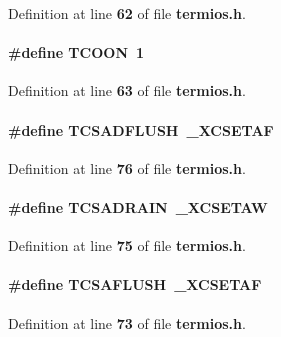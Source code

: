 Definition at line {\bf 62} of file {\bf termios.\+h}.

\paragraph[{T\+C\+O\+ON}]{\setlength{\rightskip}{0pt plus 5cm}\#define T\+C\+O\+ON~1}\label{termios_8h_a8f04f6a470c30f41df591f14c21afb60}


Definition at line {\bf 63} of file {\bf termios.\+h}.

\paragraph[{T\+C\+S\+A\+D\+F\+L\+U\+SH}]{\setlength{\rightskip}{0pt plus 5cm}\#define T\+C\+S\+A\+D\+F\+L\+U\+SH~{\bf \+\_\+\+X\+C\+S\+E\+T\+AF}}\label{termios_8h_ad427dbc740809732300cf89af99ee00e}


Definition at line {\bf 76} of file {\bf termios.\+h}.

\paragraph[{T\+C\+S\+A\+D\+R\+A\+IN}]{\setlength{\rightskip}{0pt plus 5cm}\#define T\+C\+S\+A\+D\+R\+A\+IN~{\bf \+\_\+\+X\+C\+S\+E\+T\+AW}}\label{termios_8h_ad147943bddb5fe0a4b5e8cebcdba1596}


Definition at line {\bf 75} of file {\bf termios.\+h}.

\paragraph[{T\+C\+S\+A\+F\+L\+U\+SH}]{\setlength{\rightskip}{0pt plus 5cm}\#define T\+C\+S\+A\+F\+L\+U\+SH~{\bf \+\_\+\+X\+C\+S\+E\+T\+AF}}\label{termios_8h_abb207d1ce361e562262fd82e605e9cbc}


Definition at line {\bf 73} of file {\bf termios.\+h}.

